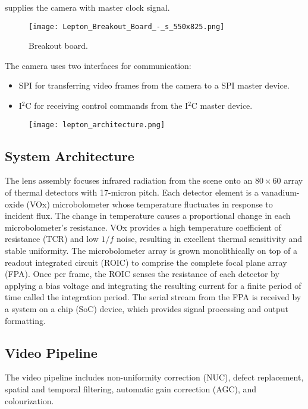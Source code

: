 supplies the camera with master clock signal.\cite{breakoutboard}
%
\begin{figure}[!htb]
    \centering
    \texttt{[image: Lepton\_Breakout\_Board\_-\_s\_550x825.png]}
    \caption{Breakout board.}
    \label{fig:breakoutboard}
 \end{figure}
\linebreak The camera uses two interfaces for communication:
\begin{itemize}
    \item SPI for transferring video frames from the camera to a SPI master
device.
    \item I$^{2}$C for receiving control commands from the I$^{2}$C master
device.
\end{itemize}
%
\begin{figure}[htb]
    \centering
    \texttt{[image: lepton\_architecture.png]}
    \label{fig:leptonarchitecture}
\end{figure}
%
\subsection{System Architecture}
\label{ssec:leptonarchitecture}
The lens assembly focuses infrared radiation from the scene onto an $80 \times
60$ array of thermal detectors with 17-micron pitch. Each detector element is a
vanadium-oxide (VOx) microbolometer whose temperature fluctuates in response to
incident flux. The change in temperature causes a proportional change in each
microbolometer’s resistance. VOx provides a high temperature coefficient of
resistance (TCR) and low $1/f$ noise, resulting in excellent thermal sensitivity
and stable uniformity. The microbolometer array is grown monolithically on top
of a readout integrated circuit (ROIC) to comprise the complete focal plane
array (FPA). Once per frame, the ROIC senses the resistance of each detector by
applying a bias voltage and integrating the resulting current for a finite
period of time called the integration period. The serial stream from the FPA is
received by a system on a chip (SoC) device, which provides signal processing
and output formatting.
%
\subsection{Video Pipeline}
\label{ssec:pipeline}
The video pipeline includes non-uniformity correction (NUC), defect replacement,
spatial and temporal filtering, automatic gain correction (AGC), and
colourization.
%
\begin{figure}[!h]
    \centering
    \resizebox{0.65\textwidth}{!}{}
    \label{fig:videopipe}
\end{figure}
